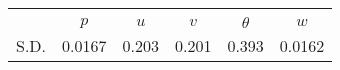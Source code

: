 \begin{tabular}{l*{1}{ccccc}}
\toprule
                &\multicolumn{5}{c}{}                             \\
                &  $  p$&$ u $&$ v $&$ \theta $&$ w $\\
\midrule
S.D.              &   0.0167&    0.203&    0.201&    0.393&   0.0162\\
\bottomrule
\end{tabular}
